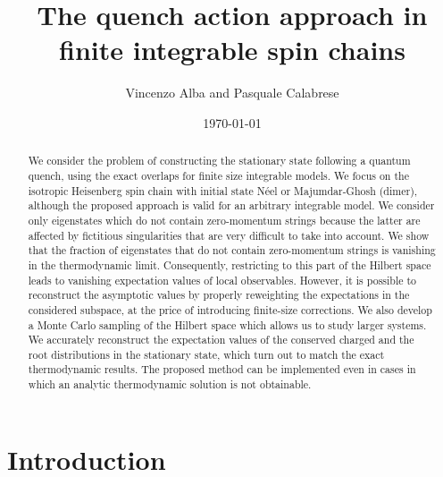 \documentclass[11pt]{iopart}
\begin{document}
\setlength{\parindent}{0pt}


\title{The quench action approach in finite integrable spin chains}


\author{Vincenzo Alba and Pasquale Calabrese }
%
\address{$^1$\,SISSA and INFN, via Bonomea 265, 34136 Trieste, Italy. }




\date{\today}



\begin{abstract} 

We consider the problem of constructing the stationary state following a quantum quench, 
using the exact overlaps for finite size integrable models. 
We focus on the isotropic Heisenberg spin chain with initial state N\'eel or Majumdar-Ghosh (dimer),
although the proposed approach is valid for an arbitrary integrable model. 
We consider only eigenstates which do not contain zero-momentum strings because the latter 
are affected by fictitious singularities that are very difficult to take into account. 
We show that the fraction of eigenstates that do not contain zero-momentum strings is vanishing 
in the thermodynamic limit. Consequently, restricting to this part of the Hilbert space leads to 
vanishing expectation values of local observables. However, it is possible to reconstruct the 
asymptotic values by properly reweighting the expectations in the considered subspace, at the 
price of introducing finite-size corrections. We also develop a Monte Carlo sampling of the 
Hilbert space which allows us to study larger systems. We accurately reconstruct the expectation 
values of the conserved charged and the root distributions in the stationary state, which turn 
out to match the exact thermodynamic results. The proposed method can be implemented even in 
cases in which an analytic thermodynamic solution is not obtainable.

\end{abstract}

\maketitle

\section{Introduction}
\label{intro}
\end{document}
